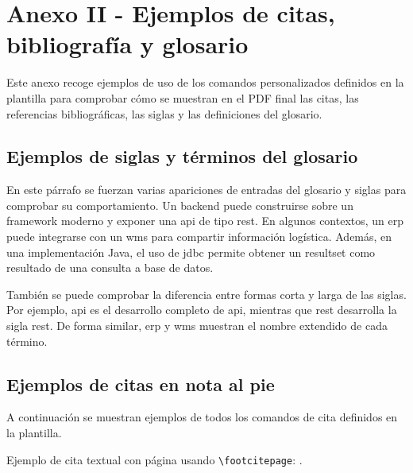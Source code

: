 \vspace*{-2cm}


\section*{Anexo II - Ejemplos de citas, bibliografía y glosario} %
\label{anexo:ejemplos_citas_bibliografia_glosario}




Este anexo recoge ejemplos de uso de los comandos personalizados definidos en la plantilla para comprobar cómo se muestran en el PDF final las citas, las referencias bibliográficas, las siglas y las definiciones del glosario.

\subsection*{Ejemplos de siglas y términos del glosario}

En este párrafo se fuerzan varias apariciones de entradas del glosario y siglas para comprobar su comportamiento. Un \gls{backend} puede construirse sobre un \gls{framework} moderno y exponer una \acrshort{api} de tipo \acrshort{rest}. En algunos contextos, un \acrshort{erp} puede integrarse con un \acrshort{wms} para compartir información logística. Además, en una implementación Java, el uso de \gls{jdbc} permite obtener un \gls{resultset} como resultado de una consulta a base de datos.

También se puede comprobar la diferencia entre formas corta y larga de las siglas. Por ejemplo, \acrlong{api} es el desarrollo completo de \acrshort{api}, mientras que \acrlong{rest} desarrolla la sigla \acrshort{rest}. De forma similar, \acrlong{erp} y \acrlong{wms} muestran el nombre extendido de cada término.

\subsection*{Ejemplos de citas en nota al pie}

A continuación se muestran ejemplos de todos los comandos de cita definidos en la plantilla.

Ejemplo de cita textual con página usando \texttt{\textbackslash footcitepage}: .

